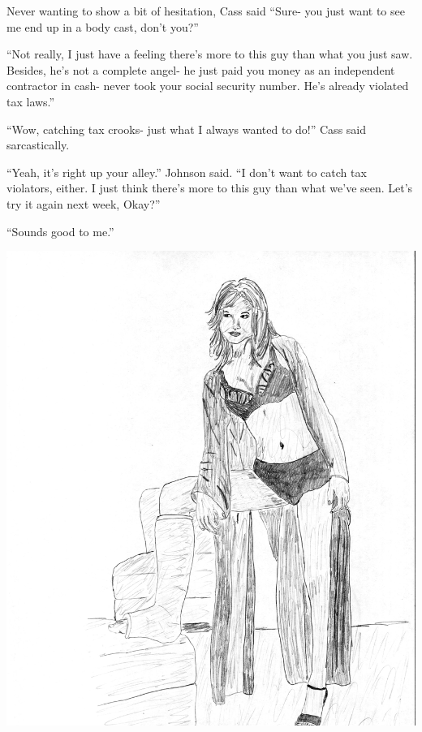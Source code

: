 Never wanting to show a bit of hesitation, Cass said ``Sure- you just want to see me end
up in a body cast, don't you?''

``Not really, I just have a feeling there's more to this guy than what you just saw.
Besides, he's not a complete angel- he just paid you money as an independent contractor in cash-
never took your social security number. He's already violated tax laws.''

``Wow, catching tax crooks- just what I always wanted to do!'' Cass said sarcastically.

``Yeah, it's right up your alley.'' Johnson said. ``I don't want to catch tax violators,
either. I just think there's more to this guy than what we've seen. Let's try it again next
week, Okay?''

``Sounds good to me.''

\begin{center}
\includegraphics{images/kicks22.jpg}
\end{center}
